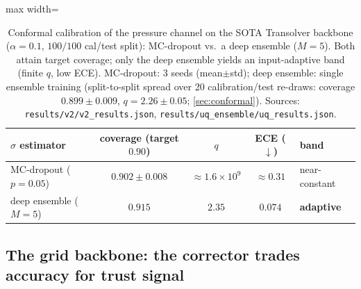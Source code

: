 \begin{table}[t]
\centering
\small
\caption{Conformal calibration of the pressure channel on the SOTA Transolver backbone
($\alpha=0.1$, $100/100$ cal/test split): MC-dropout vs.\ a deep ensemble ($M{=}5$). Both
attain target coverage; only the deep ensemble yields an input-adaptive band (finite $q$,
low ECE). MC-dropout: 3 seeds (mean$\pm$std); deep ensemble: single ensemble training
(split-to-split spread over 20 calibration/test re-draws: coverage $0.899{\pm}0.009$,
$q=2.26{\pm}0.05$; \autoref{sec:conformal}). Sources:
\texttt{results/v2/v2\_results.json}, \texttt{results/uq\_ensemble/uq\_results.json}.}
\label{tab:uq}
\begin{adjustbox}{max width=\textwidth}
\begin{tabular}{l c c c l}
\toprule
$\sigma$ estimator & coverage (target $0.90$) & $q$ & ECE ($\downarrow$) & band \\
\midrule
MC-dropout ($p{=}0.05$) & $0.902{\pm}0.008$ & $\approx 1.6\times 10^{9}$ & $\approx 0.31$ & near-constant \\
deep ensemble ($M{=}5$) & $0.915$ & $2.35$ & $\mathbf{0.074}$ & \textbf{adaptive} \\
\bottomrule
\end{tabular}
\end{adjustbox}
\end{table}



\subsection{The grid backbone: the corrector trades accuracy for trust signal}
\label{sec:indist-ablation}

